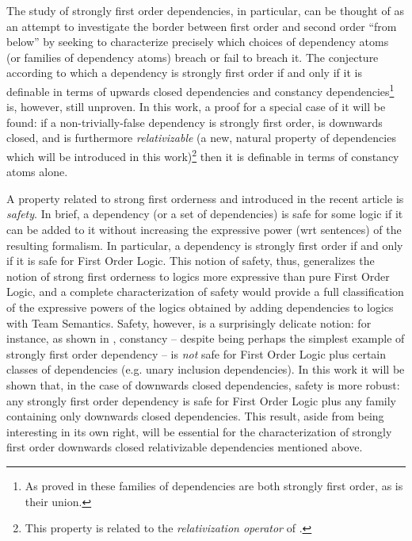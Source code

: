 \documentclass{article}
\theoremstyle{definition}
\begin{document}
The study of strongly first order dependencies, in particular, can be thought of as an attempt to investigate the border between first order and second order ``from below'' by seeking to characterize precisely which choices of dependency atoms (or families of dependency atoms) breach or fail to breach it. The conjecture according to which a dependency is strongly first order if and only if it is definable in terms of upwards closed dependencies and constancy dependencies\footnote{As proved in \cite{galliani2015upwards} these families of dependencies are both strongly first order, as is their union.} is, however, still unproven. In this work, a proof for a special case of it will be found: if a non-trivially-false dependency is strongly first order, is downwards closed, and is furthermore \emph{relativizable} (a new, natural property of dependencies which will be introduced in this work)\footnote{This property is related to the \emph{relativization operator} of \cite{ronnholm2018arity}.} then it is definable in terms of constancy atoms alone. 

A property related to strong first orderness and introduced in the recent article \cite{galliani2018safe} is \emph{safety}. In brief, a dependency (or a set of dependencies) is safe for some logic if it can be added to it without increasing the expressive power (wrt sentences) of the resulting formalism. In particular, a dependency is strongly first order if and only if it is safe for First Order Logic. This notion of safety, thus, generalizes the notion of strong first orderness to logics more expressive than pure First Order Logic, and a complete characterization of safety would provide a full classification of the expressive powers of the logics obtained by adding dependencies to logics with Team Semantics. Safety, however, is a surprisingly delicate notion: for instance, as shown in \cite{galliani2018safe}, constancy -- despite being perhaps the simplest example of strongly first order dependency -- is \emph{not} safe for First Order Logic plus certain classes of dependencies (e.g. unary inclusion dependencies). In this work it will be shown that, in the case of downwards closed dependencies, safety is more robust: any strongly first order dependency is safe for First Order Logic plus any family containing only downwards closed dependencies. This result, aside from being interesting in its own right, will be essential for the characterization of strongly first order downwards closed relativizable dependencies mentioned above. 
\end{document}

